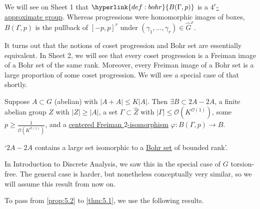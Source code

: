 \documentclass{article}
\newcommand{\named}[1]{\textbf{#1}\index{#1}}
\numberwithin{equation}{section}
\begin{document}

We will see on Sheet 1 that $\hyperlink{def:bohr}{B(\Gamma,p)}$ is a \hyperlink{def:appGroup}{$4^r$-approximate group}.
Whereas progressions were homomorphic images of boxes, $B(\Gamma,p)$ is the pullback of $[-p,p]^r$ under $(\gamma_1, \dotsc, \gamma_r) \in \hat{G}^r$.

It turns out that the notions of coset progression and Bohr set are essentially equivalent. In Sheet 2, we will see that every coset progression is a Freiman image of a Bohr set of the same rank.
Moreover, every Freiman image of a Bohr set is a large proportion of some coset progression.
We will see a special case of that shortly.

\begin{nprop}\label{prop:5.2}
  Suppose $A \subset G$ (abelian) with $|A+A| \leq K|A|$. Then $\exists B \subset 2A - 2A$, a finite abelian group $Z$ with $|Z| \geq |A|$, a set $\Gamma \subset \hat{Z}$ with $|\Gamma| \leq \mathcal{O}(K^{\mathcal{O}(1)})$, some $p \geq \frac{1}{\mathcal{O}(K^{\mathcal{O}(1)})}$, and a \hyperlink{def:fhom}{centered Freiman $2$-isomorphism} $\varphi: B(\Gamma,p) \to B$.
\end{nprop}

`$2A-2A$ contains a large set isomorphic to a \hyperlink{def:bohr}{Bohr set} of bounded rank'.

In Introduction to Discrete Analysis, we saw this in the special case of $G$ torsion-free.
The general case is harder, but nonetheless conceptually very similar, so we will assume this result from now on.

To pass from \cref{prop:5.2} to \cref{thm:5.1}, we use the following results.
\end{document}

